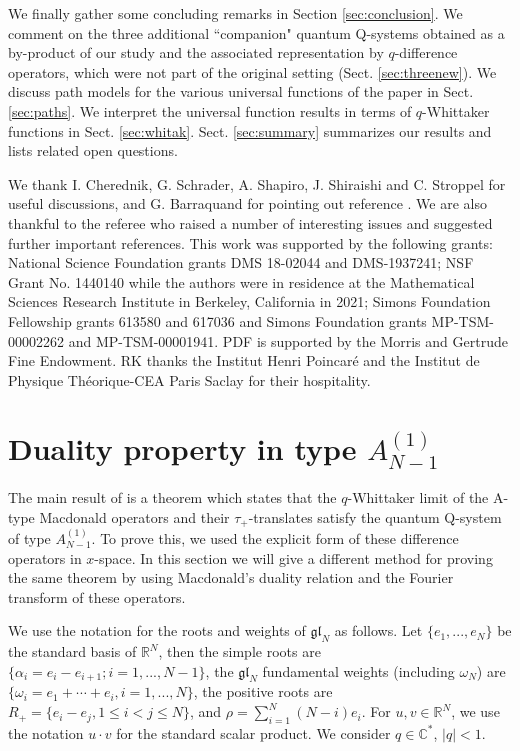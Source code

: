 \documentclass[12pt]{amsart}
\newcommand{\gl}{{\mathfrak{gl}}}
\newcommand{\C}{{\mathbb C}}
\newcommand{\R}{{\mathbb R}}
\numberwithin{equation}{section}
\begin{document}
We finally gather some concluding remarks in Section \ref{sec:conclusion}. We comment on the three additional ``companion" quantum Q-systems obtained as a by-product of our study and the associated representation by $q$-difference operators, which were not part of the original setting (Sect. \ref{sec:threenew}). We discuss path models for the various universal functions of the paper in Sect. \ref{sec:paths}. We interpret the universal function results in terms of $q$-Whittaker functions in Sect. \ref{sec:whitak}.
Sect. \ref{sec:summary} summarizes our results and lists related open questions.
\medskip

We thank I. Cherednik, G. Schrader, A. Shapiro, J. Shiraishi and C. Stroppel for useful discussions, and G. Barraquand for pointing out reference \cite{Rains}.
We are also thankful to the referee who raised a number of interesting issues and suggested further important references. 
This work was supported by the following grants: National Science Foundation grants DMS 18-02044 and DMS-1937241; 
NSF Grant No. 1440140 while the authors were in residence at the Mathematical Sciences Research Institute in Berkeley, California in 2021; Simons Foundation Fellowship grants 613580 and 617036 and 
Simons Foundation grants MP-TSM-00002262 and MP-TSM-00001941.
PDF is supported by the Morris and Gertrude Fine Endowment.
RK thanks the Institut Henri Poincar\'e and the Institut de Physique Th\'eorique-CEA Paris Saclay for their hospitality.


\section{Duality property in type $A^{(1)}_{N-1}$}\label{Atype}


The main result of \cite{DFK15} is a theorem which states that the $q$-Whittaker limit of the A-type Macdonald operators and their $\tau_+$-translates satisfy the quantum Q-system of type $A_{N-1}^{(1)}$. To prove this, we used the explicit form of these difference operators in $x$-space. In this section we will give a different method for proving the same theorem by using Macdonald's duality relation and the Fourier transform of these operators.

We use the notation for the roots and weights of $\gl_N$ as follows. Let $\{e_1,...,e_N\}$ be the standard basis of $\R^N$, then the simple roots are $\{\alpha_i=e_i-e_{i+1}; i=1,...,N-1\}$, the $\gl_N$ fundamental weights (including  $\omega_N$) are $\{\omega_i = e_1 + \cdots + e_i, i=1,...,N\}$, the positive roots are $R_+=\{e_i-e_j, 1\leq i<j\leq N\}$, and $\rho=\sum_{i=1}^N (N-i)e_i$. For $u,v\in \R^N$, we use the notation $u\cdot v$ for the standard scalar product. We consider $q\in\C^*$, $|q|<1$.
\end{document}
